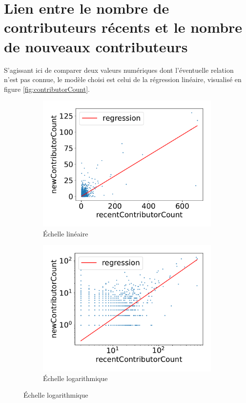 \section{Lien entre le nombre de contributeurs récents et le nombre de nouveaux contributeurs}

S'agissant ici de comparer deux valeurs numériques dont l'éventuelle relation n'est pas connue, le modèle
choisi est celui de la régression linéaire, visualisé en figure \ref{fig:contributorCount}.

\begin{figure}
    \centering
    \begin{subfigure}[t]{0.5\textwidth}
        \includegraphics[width=\textwidth]{../experiment/data_analysis/recentContributorCountRegression_linearScale}
        \caption{Échelle linéaire}
    \end{subfigure}%
    \begin{subfigure}[t]{0.5\textwidth}
        \includegraphics[width=\textwidth]{../experiment/data_analysis/recentContributorCountRegression_logScale}
        \caption{Échelle logarithmique}
    \end{subfigure}


\end{figure}
